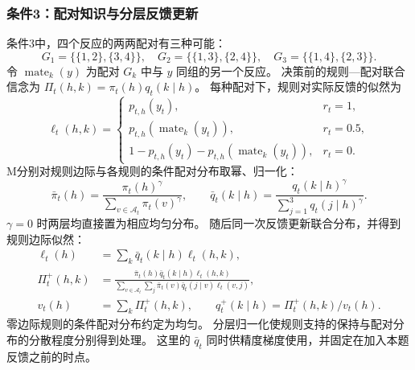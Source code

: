 \documentclass[11pt,a4paper]{article}
\numberwithin{equation}{section}
\newcommand{\A}{\mathcal{A}}
\begin{document}
\subsubsection{条件3：配对知识与分层反馈更新}
\label{sec:pairing}
条件3中，四个反应的两两配对有三种可能：
\begin{equation}
G_1=\{\{1,2\},\{3,4\}\},\quad
G_2=\{\{1,3\},\{2,4\}\},\quad
G_3=\{\{1,4\},\{2,3\}\}.
\end{equation}
令 $\operatorname{mate}_k(y)$ 为配对 $G_k$ 中与 $y$ 同组的另一个反应。
决策前的规则—配对联合信念为 $\Pi_t(h,k)=\pi_t(h)q_t(k\mid h)$。
每种配对下，规则对实际反馈的似然为
\begin{equation}
\ell_t(h,k)=
\begin{cases}
p_{t,h}(y_t),&r_t=1,\\
p_{t,h}(\operatorname{mate}_k(y_t)),&r_t=0.5,\\
1-p_{t,h}(y_t)-p_{t,h}(\operatorname{mate}_k(y_t)),&r_t=0.
\end{cases}
\label{eq:pairing-likelihood}
\end{equation}
M分别对规则边际与各规则的条件配对分布取幂、归一化：
\begin{equation}
\bar\pi_t(h)=\frac{\pi_t(h)^\gamma}{\sum_{v\in\A_t}\pi_t(v)^\gamma},\qquad
\bar q_t(k\mid h)=\frac{q_t(k\mid h)^\gamma}{\sum_{j=1}^{3}q_t(j\mid h)^\gamma}.
\label{eq:factorized-forgetting}
\end{equation}
$\gamma=0$ 时两层均直接置为相应均匀分布。
随后同一次反馈更新联合分布，并得到规则边际似然：
\begin{align}
\ell_t(h)&=\sum_k\bar q_t(k\mid h)\ell_t(h,k),\\
\Pi_t^+(h,k)&=\frac{\bar\pi_t(h)\bar q_t(k\mid h)\ell_t(h,k)}
{\sum_{v\in\A_t}\sum_j\bar\pi_t(v)\bar q_t(j\mid v)\ell_t(v,j)},\\
v_t(h)&=\sum_k\Pi_t^+(h,k),\qquad
q_t^+(k\mid h)=\Pi_t^+(h,k)/v_t(h).
\label{eq:pairing-posterior}
\end{align}
零边际规则的条件配对分布约定为均匀。
分层归一化使规则支持的保持与配对分布的分散程度分别得到处理。
这里的 $\bar q_t$ 同时供精度梯度使用，并固定在加入本题反馈之前的时点。
\end{document}
